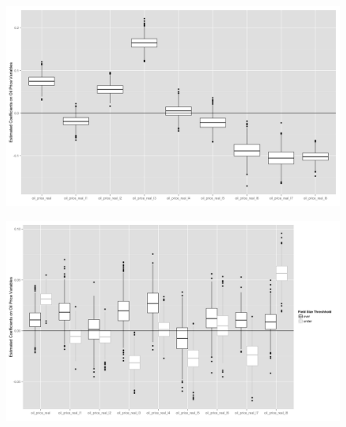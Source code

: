 \documentclass{beamer}
\begin{document}
\begin{frame}[plain]
\begin{figure}
	\includegraphics[width=1\textwidth]{figures/invest_pooled_print.png}
	\label{gam_price_invest_box}
\end{figure}
\end{frame}


\begin{frame}[plain]
	\begin{figure}
	\includegraphics[width=1\textwidth]{figures/gam_postpeak_print.png}
	\label{gam_postpeak_pres}
	\end{figure}
\end{frame}
\end{document}

